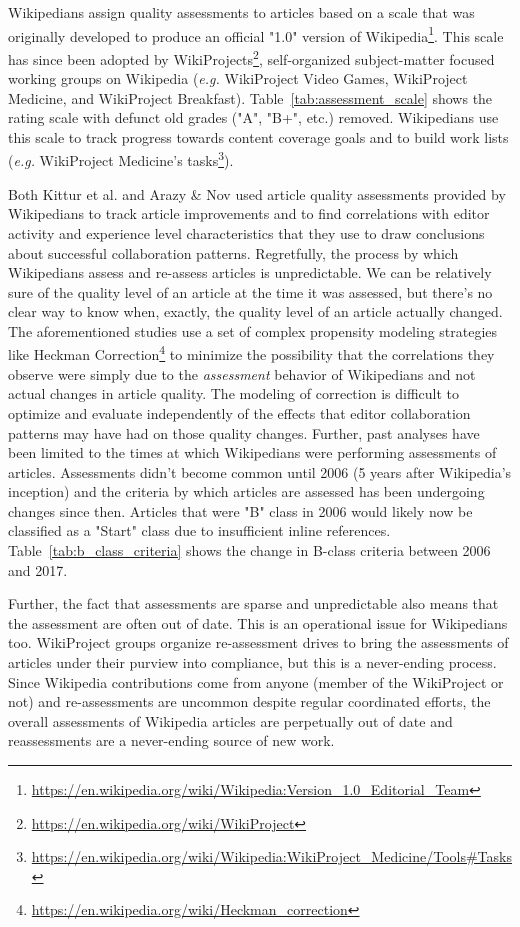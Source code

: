 

 Wikipedians assign quality assessments to articles based on a scale that was originally developed to produce an official "1.0" version of Wikipedia\footnote{\url{https://en.wikipedia.org/wiki/Wikipedia:Version_1.0_Editorial_Team}}.  This scale has since been adopted by WikiProjects\footnote{\url{https://en.wikipedia.org/wiki/WikiProject}}, self-organized subject-matter focused working groups on Wikipedia (\emph{e.g.} WikiProject Video Games, WikiProject Medicine, and WikiProject Breakfast).  Table~\ref{tab:assessment_scale} shows the rating scale with defunct old grades ("A", "B+", etc.) removed.  Wikipedians use this scale to track progress towards content coverage goals and to build work lists (\emph{e.g.} WikiProject Medicine's tasks\footnote{\url{https://en.wikipedia.org/wiki/Wikipedia:WikiProject_Medicine/Tools\#Tasks}}).

Both Kittur et al.\cite{kittur08harnessing} and Arazy \& Nov\cite{arazy10determinants} used article quality assessments provided by Wikipedians to track article improvements and to find correlations with editor activity and experience level characteristics that they use to draw conclusions about successful collaboration patterns.  Regretfully, the process by which Wikipedians assess and re-assess articles is unpredictable.  We can be relatively sure of the quality level of an article at the time it was assessed, but there's no clear way to know when, exactly, the quality level of an article actually changed.  The aforementioned studies use a set of complex propensity modeling strategies like Heckman Correction\footnote{\url{https://en.wikipedia.org/wiki/Heckman_correction}} to minimize the possibility that the correlations they observe were simply due to the \emph{assessment} behavior of Wikipedians and not actual changes in article quality.  The modeling of correction is difficult to optimize and evaluate independently of the effects that editor collaboration patterns may have had on those quality changes.  Further, past analyses have been limited to the times at which Wikipedians were performing assessments of articles.  Assessments didn't become common until 2006 (5 years after Wikipedia's inception) and the criteria by which articles are assessed has been undergoing changes since then.  Articles that were "B" class in 2006 would likely now be classified as a "Start" class due to insufficient inline references.  Table~\ref{tab:b_class_criteria} shows the change in B-class criteria between 2006 and 2017.

Further, the fact that assessments are sparse and unpredictable also means that the assessment are often out of date.  This is an operational issue for Wikipedians too.  WikiProject groups organize re-assessment drives to bring the assessments of articles under their purview into compliance, but this is a never-ending process.  Since Wikipedia contributions come from anyone (member of the WikiProject or not) and re-assessments are uncommon despite regular coordinated efforts, the overall assessments of Wikipedia articles are perpetually out of date and reassessments are a never-ending source of new work.


